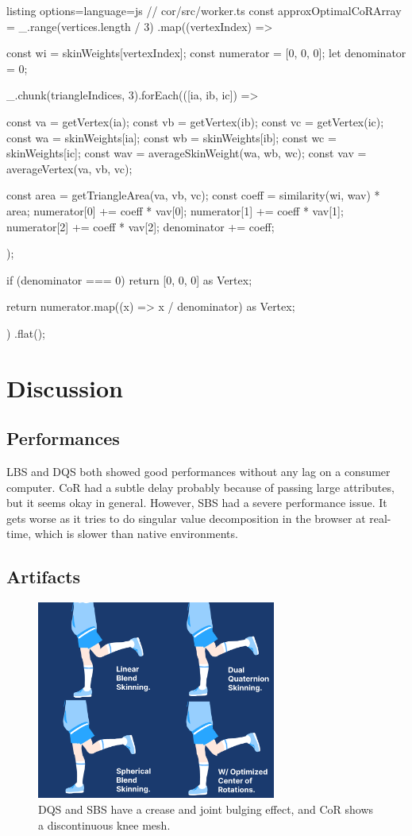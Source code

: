 \documentclass{homework}
\begin{document}
\begin{tcblisting}{listing options={language=js}}
// cor/src/worker.ts
const approxOptimalCoRArray = _.range(vertices.length / 3)
  .map((vertexIndex) => {
    const wi = skinWeights[vertexIndex];
    const numerator = [0, 0, 0];
    let denominator = 0;

    _.chunk(triangleIndices, 3).forEach(([ia, ib, ic]) => {
      const va = getVertex(ia);
      const vb = getVertex(ib);
      const vc = getVertex(ic);
      const wa = skinWeights[ia];
      const wb = skinWeights[ib];
      const wc = skinWeights[ic];
      const wav = averageSkinWeight(wa, wb, wc);
      const vav = averageVertex(va, vb, vc);

      const area = getTriangleArea(va, vb, vc);
      const coeff = similarity(wi, wav) * area;
      numerator[0] += coeff * vav[0];
      numerator[1] += coeff * vav[1];
      numerator[2] += coeff * vav[2];
      denominator += coeff;
    });

    if (denominator === 0) {
      return [0, 0, 0] as Vertex;
    }

    return numerator.map((x) => x / denominator) as Vertex;
  })
  .flat();
\end{tcblisting}


\section{Discussion}
\subsection{Performances}
LBS and DQS both showed good performances without any lag on a consumer computer. CoR had a subtle delay probably because of passing large attributes, but it seems okay in general. However, SBS had a severe performance issue. It gets worse as it tries to do singular value decomposition in the browser at real-time, which is slower than native environments.

\subsection{Artifacts}

\begin{figure}[H]
    \centering
    \includegraphics[width=0.7\textwidth]{images/artifact2.png}
    \caption{DQS and SBS have a crease and joint bulging effect, and CoR shows a discontinuous knee mesh.}
\end{figure}
\end{document}
